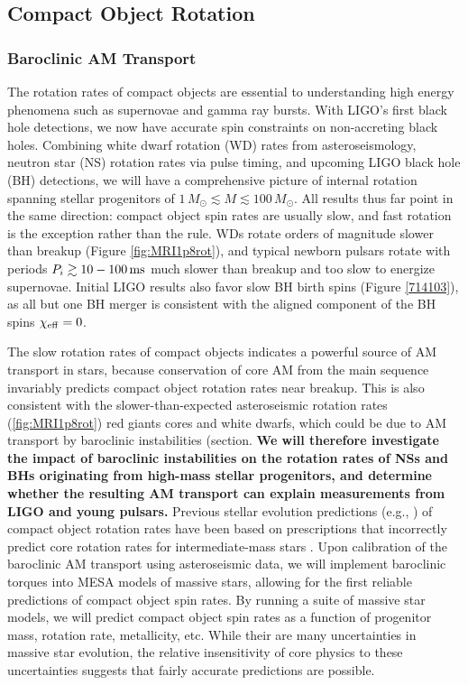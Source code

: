 \subsection{Compact Object Rotation}

\subsubsection{Baroclinic AM Transport}

The rotation rates of compact objects are essential to understanding high energy phenomena such as supernovae and gamma ray bursts. With LIGO's first black hole detections, we now have accurate spin constraints on non-accreting black holes. Combining white dwarf rotation (WD) rates from asteroseismology, neutron star (NS) rotation rates via pulse timing, and upcoming LIGO black hole (BH) detections, we will have a comprehensive picture of internal rotation spanning stellar progenitors of $1 \, M_\odot \! \lesssim \! M \! \lesssim \! 100 \, M_\odot$. All results thus far point in the same direction: compact object spin rates are usually slow, and fast rotation is the exception rather than the rule. WDs rotate orders of magnitude slower than breakup (Figure \ref{fig:MRI1p8rot}), and typical newborn pulsars rotate with periods $P_{i} \gtrsim 10-100 \, {\rm ms}$ \citep{faucher:06,igoshev:13,gullon:14} much slower than breakup and too slow to energize supernovae. Initial LIGO results also favor slow BH birth spins (Figure \ref{714103}), as all but one BH merger is consistent with the aligned component of the BH spins $\chi_{\rm eff} = 0$.

The slow rotation rates of compact objects indicates a powerful source of AM transport in stars, because conservation of core AM from the main sequence invariably predicts compact object rotation rates near breakup. This is also consistent with the slower-than-expected asteroseismic rotation rates (\ref{fig:MRI1p8rot}) red giants cores and white dwarfs, which could be due to AM transport by baroclinic instabilities (section. {\bf We will therefore investigate the impact of baroclinic instabilities on the rotation rates of NSs and BHs originating from high-mass stellar progenitors, and determine whether the resulting AM transport can explain measurements from LIGO and young pulsars.} Previous stellar evolution predictions (e.g., \citealt{heger:00}) of compact object rotation rates have been based on prescriptions that incorrectly predict core rotation rates for intermediate-mass stars \citep{cantiello:14}. Upon calibration of the baroclinic AM transport using asteroseismic data, we will implement baroclinic torques into MESA models of massive stars, allowing for the first reliable predictions of compact object spin rates. By running a suite of massive star models, we will predict compact object spin rates as a function of progenitor mass, rotation rate, metallicity, etc. While their are many uncertainties in massive star evolution, the relative insensitivity of core physics to these uncertainties suggests that fairly accurate predictions are possible.

